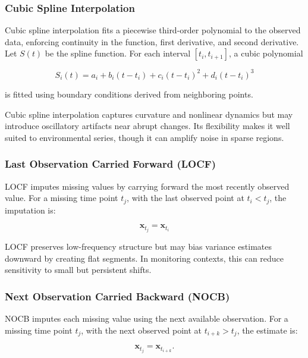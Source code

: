 \subsubsection{Cubic Spline Interpolation}

Cubic spline interpolation fits a piecewise third-order polynomial to the observed data, enforcing continuity in the function, first derivative, and second derivative.  
Let \(S(t)\) be the spline function. For each interval \([t_i, t_{i+1}]\), a cubic polynomial

\begin{equation}
S_i(t) = a_i + b_i(t - t_i) + c_i(t - t_i)^2 + d_i(t - t_i)^3
\end{equation}

is fitted using boundary conditions derived from neighboring points.

Cubic spline interpolation captures curvature and nonlinear dynamics but may introduce oscillatory artifacts near abrupt changes. Its flexibility makes it well suited to environmental series, though it can amplify noise in sparse regions.


\subsubsection{Last Observation Carried Forward (\ac{LOCF})}

\ac{LOCF} imputes missing values by carrying forward the most recently observed value. For a missing time point \(t_j\), with the last observed point at \(t_i < t_j\), the imputation is:

\begin{equation}
\mathbf{x}_{t_j} = \mathbf{x}_{t_i}
\end{equation}

\ac{LOCF} preserves low-frequency structure but may bias variance estimates downward by creating flat segments. In monitoring contexts, this can reduce sensitivity to small but persistent shifts.


\subsubsection{Next Observation Carried Backward (\ac{NOCB})}

\ac{NOCB} imputes each missing value using the next available observation. For a missing time point \(t_j\), with the next observed point at \(t_{i+k} > t_j\), the estimate is:

\begin{equation}
\mathbf{x}_{t_j} = \mathbf{x}_{t_{i+k}}.
\end{equation}

